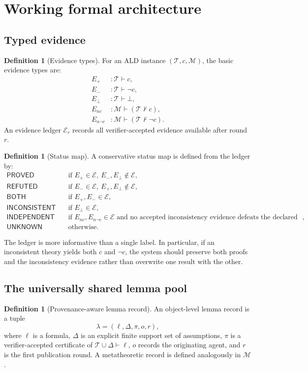 \documentclass[11pt]{article}
\theoremstyle{definition}
\newtheorem{definition}[theorem]{Definition}
\theoremstyle{remark}
\newcommand{\T}{\mathcal T}
\newcommand{\M}{\mathcal M}
\newcommand{\Ev}{\mathcal E}
\newcommand{\Prov}{\mathsf{PROVED}}
\newcommand{\Refut}{\mathsf{REFUTED}}
\newcommand{\Ind}{\mathsf{INDEPENDENT}}
\newcommand{\Inc}{\mathsf{INCONSISTENT}}
\newcommand{\Both}{\mathsf{BOTH}}
\newcommand{\Unknown}{\mathsf{UNKNOWN}}
\begin{document}
\section{Working formal architecture}

\subsection{Typed evidence}
\begin{definition}[Evidence types]
For an ALD instance $(\T,c,\M)$, the basic evidence types are:
\begin{align*}
E_{+} &: \T\vdash c,\\
E_{-} &: \T\vdash\neg c,\\
E_{\bot} &: \T\vdash\bot,\\
E_{nc} &: \M\vdash (\T\nvdash c),\\
E_{n\neg c} &: \M\vdash (\T\nvdash\neg c).
\end{align*}
An evidence ledger $\Ev_r$ records all verifier-accepted evidence available after round $r$.
\end{definition}

\begin{definition}[Status map]
A conservative status map is defined from the ledger by:
\begin{align*}
\Prov &\quad\text{if }E_{+}\in\Ev,\ E_{-},E_{\bot}\notin\Ev,\\
\Refut &\quad\text{if }E_{-}\in\Ev,\ E_{+},E_{\bot}\notin\Ev,\\
\Both &\quad\text{if }E_{+},E_{-}\in\Ev,\\
\Inc &\quad\text{if }E_{\bot}\in\Ev,\\
\Ind &\quad\text{if }E_{nc},E_{n\neg c}\in\Ev\text{ and no accepted inconsistency evidence defeats the declared interpretation},\\
\Unknown &\quad\text{otherwise.}
\end{align*}
\end{definition}

The ledger is more informative than a single label. In particular, if an inconsistent theory yields both $c$ and $\neg c$, the system should preserve both proofs and the inconsistency evidence rather than overwrite one result with the other.

\subsection{The universally shared lemma pool}
\begin{definition}[Provenance-aware lemma record]
An object-level lemma record is a tuple
\[
\lambda=(\ell,\Delta,\pi,o,r),
\]
where $\ell$ is a formula, $\Delta$ is an explicit finite support set of assumptions, $\pi$ is a verifier-accepted certificate of $\T\cup\Delta\vdash\ell$, $o$ records the originating agent, and $r$ is the first publication round. A metatheoretic record is defined analogously in $\M$.
\end{definition}
\end{document}
